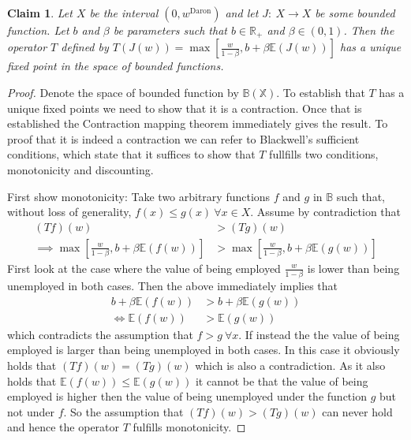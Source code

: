 \newtheorem{claim}{Claim}
\begin{claim}
  Let $X$ be the interval $(0, w^{\text{Daron}})$ and let
  $J:~X \to X$ be some bounded function. Let $b$ and $\beta$ be
  parameters such that $b \in \mathbb{R}_+$ and $\beta \in (0, 1)$. Then the
  operator $T$ defined by $T(J(w)) = \max \left[ \frac{w}{1 - \beta}, b +
    \beta \mathbb{E} \left(J(w)\right)\right]$ has a unique fixed point in the
  space of bounded functions.
\end{claim}
\begin{proof}
  Denote the space of bounded function by $\mathbb{B(X)}$. To
  establish that $T$ has a unique fixed points we need to show that it is a
  contraction. Once that is established the Contraction mapping theorem
  immediately gives the result. To proof that it is indeed a contraction we can
  refer to Blackwell's sufficient conditions, which state that it suffices to
  show that $T$ fullfills two conditions, monotonicity and discounting. 

  First show monotonicity: Take two arbitrary functions $f$ and $g$ in
  $\mathbb{B}$ such that, without loss of generality, $f(x) \leq g(x)~\forall x
  \in X$. Assume by contradiction that
  \begin{align*}
    (Tf)(w) &> (Tg)(w) \\
    \implies \max \left[\frac{w}{1 - \beta}, b + \beta \mathbb{E}(f(w))\right]
            &> \max \left[\frac{w}{1 - \beta}, b + \beta \mathbb{E}(g(w))\right]
  \end{align*}
  First look at the case where the value of being employed $\frac{w}{1 -
    \beta}$ is lower than being unemployed in both cases. Then the above
  immediately implies that
  \begin{align*}
    b + \beta \mathbb{E}(f(w)) &> b + \beta \mathbb{E}(g(w)) \\
    \iff \mathbb{E}(f(w)) &> \mathbb{E}(g(w))
  \end{align*}
  which contradicts the assumption that $f>g~\forall x$. If instead the the
  value of being employed is larger than being unemployed in both cases. In
  this case it obviously holds that $(Tf)(w) = (Tg)(w)$ which is also a
  contradiction. As it also holds that $\mathbb{E}(f(w)) \leq \mathbb{E}(g(w))$
  it cannot be that the value of being employed is higher then the value of
  being unemployed under the function $g$ but not under $f$. So the assumption
  that $(Tf)(w) > (Tg)(w)$ can never hold and hence the operator $T$ fulfills
  monotonicity.


\end{proof}
